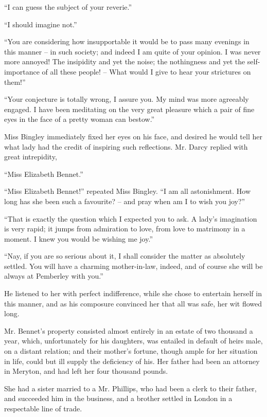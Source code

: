 “I can guess the subject of your reverie.”

“I should imagine not.”

“You are considering how insupportable it would be
to pass many evenings in this manner -- in such society;
and indeed I am quite of your opinion. I was never
more annoyed! The insipidity and yet the noise; the
nothingness and yet the self-importance of all these
people! -- What would I give to hear your strictures on
them!”

“Your conjecture is totally wrong, I assure you. My
mind was more agreeably engaged. I have been meditating
on the very great pleasure which a pair of fine eyes
in the face of a pretty woman can bestow.”

Miss Bingley immediately fixed her eyes on his face,
and desired he would tell her what lady had the credit
of inspiring such reflections. Mr. Darcy replied with
great intrepidity,

“Miss Elizabeth Bennet.”

“Miss Elizabeth Bennet!” repeated Miss Bingley.
“I am all astonishment. How long has she been such
a favourite? -- and pray when am I to wish you joy?”

“That is exactly the question which I expected you
to ask. A lady’s imagination is very rapid; it jumps
from admiration to love, from love to matrimony in a
moment. I knew you would be wishing me joy.”

“Nay, if you are so serious about it, I shall consider
the matter as absolutely settled. You will have a charming
mother-in-law, indeed, and of course she will be always
at Pemberley with you.”

He listened to her with perfect indifference, while she
chose to entertain herself in this manner, and as his composure
convinced her that all was safe, her wit flowed long.


Mr. Bennet’s property consisted almost entirely in an
estate of two thousand a year, which, unfortunately for
his daughters, was entailed in default of heirs male, on
a distant relation; and their mother’s fortune, though
ample for her situation in life, could but ill supply the
deficiency of his. Her father had been an attorney in
Meryton, and had left her four thousand pounds.

She had a sister married to a Mr. Phillips, who had
been a clerk to their father, and succeeded him in the
business, and a brother settled in London in a respectable
line of trade.

